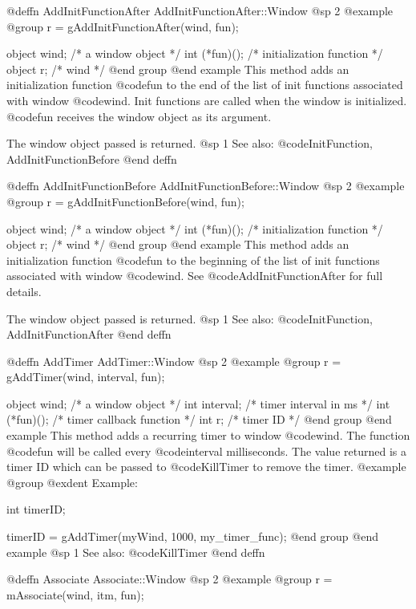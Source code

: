 @deffn {AddInitFunctionAfter} AddInitFunctionAfter::Window
@sp 2
@example
@group
r = gAddInitFunctionAfter(wind, fun);

object  wind;      /*  a window object       */
int    (*fun)();   /*  initialization function */
object  r;         /*  wind                  */
@end group
@end example
This method adds an initialization function @code{fun} to the end of
the list of init functions associated with window @code{wind}.
Init functions are called when the window is initialized.
@code{fun} receives the window object as its argument.

The window object passed is returned.
@sp 1
See also:  @code{InitFunction, AddInitFunctionBefore}
@end deffn




@deffn {AddInitFunctionBefore} AddInitFunctionBefore::Window
@sp 2
@example
@group
r = gAddInitFunctionBefore(wind, fun);

object  wind;      /*  a window object       */
int    (*fun)();   /*  initialization function */
object  r;         /*  wind                  */
@end group
@end example
This method adds an initialization function @code{fun} to the beginning of
the list of init functions associated with window @code{wind}.
See @code{AddInitFunctionAfter} for full details.

The window object passed is returned.
@sp 1
See also:  @code{InitFunction, AddInitFunctionAfter}
@end deffn




@deffn {AddTimer} AddTimer::Window
@sp 2
@example
@group
r = gAddTimer(wind, interval, fun);

object  wind;      /*  a window object         */
int     interval;  /*  timer interval in ms    */
int    (*fun)();   /*  timer callback function */
int     r;         /*  timer ID                */
@end group
@end example
This method adds a recurring timer to window @code{wind}.
The function @code{fun} will be called every @code{interval}
milliseconds.  The value returned is a timer ID which can be
passed to @code{KillTimer} to remove the timer.
@example
@group
@exdent Example:

int  timerID;

timerID = gAddTimer(myWind, 1000, my_timer_func);
@end group
@end example
@sp 1
See also:  @code{KillTimer}
@end deffn




@deffn {Associate} Associate::Window
@sp 2
@example
@group
r = mAssociate(wind, itm, fun);

